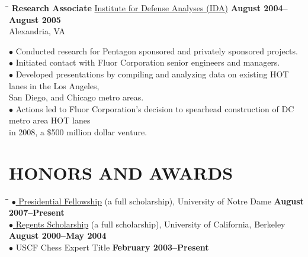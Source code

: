\documentclass{resume}
\begin{document}
\begin{resume}
	\begin{tabbing}
		\hspace{2.3in}\= \hspace{2.6in}\= \kill
        {\bf Research Associate } \>\href{https://www.ida.org/}{Institute for
        Defense Analyses (IDA)} \>  
	\textbf{August 2004--August 2005}\\
		\>Alexandria, VA
	\end{tabbing}\vspace{-15pt}
	$\bullet$ Conducted research for Pentagon sponsored and privately
	sponsored projects. 
	\\ 
	$\bullet$ Initiated contact with Fluor Corporation senior
	engineers and managers. 
	\\
	$\bullet$ Developed presentations by compiling and
	analyzing data on existing HOT lanes in the Los Angeles, \\
	\phantom{$\bullet$} San Diego, and
	Chicago metro areas.  
	\\
	$\bullet$ Actions led to Fluor Corporation's decision to
	spearhead construction of DC metro area HOT lanes\\
	\phantom{$\bullet$} in 2008, a \$500
	million dollar venture.

	\section{HONORS AND AWARDS} 
	\vspace{-0.1in}
	\begin{tabbing}
	  \hspace{2.3in}\= \hspace{2.6in}\= \kill
    \href{http://graduateschool.nd.edu/admissions/financial-support/prestigious-fellowships/presidential-fellowships-arthur-j-schmitt-fellowships/}{$\bullet$ Presidential
    Fellowship} (a full scholarship), University of Notre Dame \>\> \textbf{August 2007--Present} \\
    \href{http://students.berkeley.edu/finaid/undergraduates/types_regents.htm}{$\bullet$ Regents
    Scholarship} (a full scholarship), University of California, 
    Berkeley \>\> \textbf{August 2000--May 2004} \\
    $\bullet$ USCF Chess Expert Title \>\>\textbf{February 2003--Present}
      \end{tabbing}

\end{resume}
\end{document}
